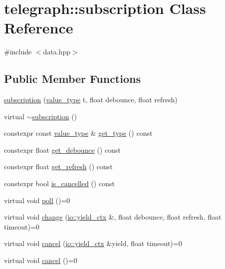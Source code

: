 \hypertarget{classtelegraph_1_1subscription}{}\section{telegraph\+:\+:subscription Class Reference}
\label{classtelegraph_1_1subscription}


{\ttfamily \#include $<$data.\+hpp$>$}

\subsection*{Public Member Functions}
\begin{DoxyCompactItemize}
\item 
\hyperlink{classtelegraph_1_1subscription_ae4c98364487057db2aa99675dac8afb5}{subscription} (\hyperlink{classtelegraph_1_1value__type}{value\+\_\+type} t, float debounce, float refresh)
\item 
virtual \hyperlink{classtelegraph_1_1subscription_a8a9cf662e9a068514d9595d9df0a48ca}{$\sim$subscription} ()
\item 
constexpr const \hyperlink{classtelegraph_1_1value__type}{value\+\_\+type} \& \hyperlink{classtelegraph_1_1subscription_a9a574364550840ba96c594a4dab83b9e}{get\+\_\+type} () const
\item 
constexpr float \hyperlink{classtelegraph_1_1subscription_a8ce2ae85cf733760222ed81db2791acf}{get\+\_\+debounce} () const
\item 
constexpr float \hyperlink{classtelegraph_1_1subscription_a92eb73e4f104fefbdfe886ec8122a2b7}{get\+\_\+refresh} () const
\item 
constexpr bool \hyperlink{classtelegraph_1_1subscription_a9dc4805fc25661d3901e8a4181e2e0f1}{is\+\_\+cancelled} () const
\item 
virtual void \hyperlink{classtelegraph_1_1subscription_a55d47626d788e73317c5b8525d1369ff}{poll} ()=0
\item 
virtual void \hyperlink{classtelegraph_1_1subscription_a18cf566e14d908c2403bb31a4114f3b9}{change} (\hyperlink{structboost_1_1asio_1_1yield__ctx}{io\+::yield\+\_\+ctx} \&, float debounce, float refresh, float timeout)=0
\item 
virtual void \hyperlink{classtelegraph_1_1subscription_ae8efc1bddc19862bf79ea2659e3ae980}{cancel} (\hyperlink{structboost_1_1asio_1_1yield__ctx}{io\+::yield\+\_\+ctx} \&yield, float timeout)=0
\item 
virtual void \hyperlink{classtelegraph_1_1subscription_aa4917994240c530af2fd0e2a5bff435c}{cancel} ()=0
\end{DoxyCompactItemize}

